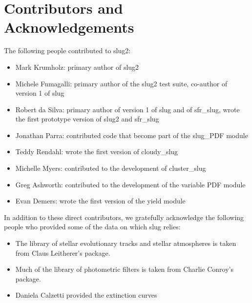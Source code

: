 \documentclass[letterpaper,10pt,english]{sphinxmanual}
\begin{document}
\chapter{Contributors and Acknowledgements}
\label{\detokenize{acknowledgements::doc}}\label{\detokenize{acknowledgements:contributors-and-acknowledgements}}
The following people contributed to slug2:
\begin{itemize}
\item {} 
Mark Krumholz: primary author of slug2

\item {} 
Michele Fumagalli: primary author of the slug2 test suite, co-author of version 1 of slug

\item {} 
Robert da Silva: primary author of version 1 of slug and of sfr\_slug, wrote the first prototype version of slug2 and sfr\_slug

\item {} 
Jonathan Parra: contributed code that become part of the slug\_PDF module

\item {} 
Teddy Rendahl: wrote the first version of cloudy\_slug

\item {} 
Michelle Myers: contributed to the development of cluster\_slug

\item {} 
Greg Ashworth: contributed to the development of the variable PDF module

\item {} 
Evan Demers: wrote the first version of the yield module

\end{itemize}

In addition to these direct contributors, we gratefully acknowledge the following people who provided some of the data on which slug relies:
\begin{itemize}
\item {} 
The library of stellar evolutionary tracks and stellar atmospheres is taken from Claus Leitherer’s  package.

\item {} 
Much of the library of photometric filters is taken from Charlie Conroy’s  package.

\item {} 
Daniela Calzetti provided the extinction curves

\end{itemize}
\end{document}
